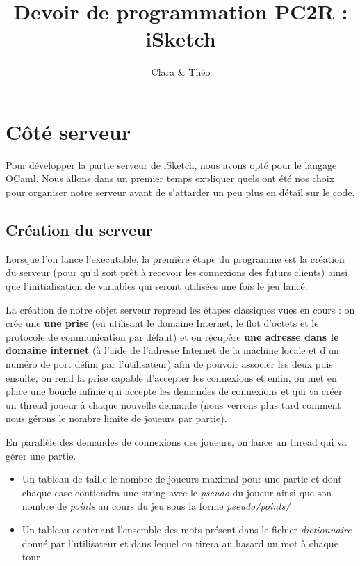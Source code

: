\documentclass[a4paper, 11pt]{article}
\title{Devoir de programmation PC2R : iSketch}
\author{Clara \bsc{Muller} \& Théo \bsc{Lebourg}}
\date{}
\begin{document}
\maketitle

\section{Côté serveur}
Pour développer la partie serveur de iSketch, nous avons opté pour le
langage OCaml. Nous allons dans un premier temps expliquer quels ont
été nos choix pour organiser notre serveur avant de s’attarder un peu
plus en détail sur le code.

\subsection {Création du serveur}
Lorsque l'on lance l’executable, la première étape du programme est la
création du serveur (pour qu’il soit prêt à recevoir les connexions
des futurs clients) ainsi que l’initialisation de variables qui seront
utilisées une fois le jeu lancé.

\bigskip La création de notre objet serveur reprend les étapes
classiques vues en cours : on crée une \textbf{une prise} (en
utilisant le domaine Internet, le flot d’octets et le protocole de
communication par défaut) et on récupère \textbf{une adresse dans le
  domaine internet} (à l’aide de l’adresse Internet de la machine
locale et d’un numéro de port défini par l’utilisateur) afin de
pouvoir associer les deux puis ensuite, on rend la prise capable
d’accepter les connexions et enfin, on met en place une boucle infinie
qui accepte les demandes de connexions et qui va créer un thread
joueur à chaque nouvelle demande (nous verrons plus tard comment nous
gérons le nombre limite de joueurs par partie).

\bigskip En parallèle des demandes de connexions
des joueurs, on lance un thread qui va gérer une partie.
\begin{itemize}
\item Un tableau de taille le nombre de joueurs maximal pour une
  partie et dont chaque case contiendra une string avec le
  \textit{pseudo} du joueur ainsi que son nombre de \textit{points} au
  cours du jeu sous la forme \textit{pseudo/points/}
\item Un tableau contenant l’ensemble des mots présent dans le fichier
  \textit{dictionnaire} donné par l’utilisateur et dans lequel on
  tirera au hasard un mot à chaque tour
\end{itemize}
\end{document}
